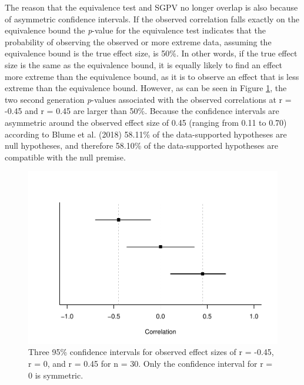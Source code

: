 \documentclass[,man,floatsintext]{apa6}
\begin{document}
The reason that the equivalence test and SGPV no longer overlap is also
because of asymmetric confidence intervals. If the observed correlation
falls exactly on the equivalence bound the \emph{p}-value for the
equivalence test indicates that the probability of observing the
observed or more extreme data, assuming the equivalence bound is the
true effect size, is 50\%. In other words, if the true effect size is
the same as the equivalence bound, it is equally likely to find an
effect more extreme than the equivalence bound, as it is to observe an
effect that is less extreme than the equivalence bound. However, as can
be seen in Figure \ref{fig:TOSTSGPV12}, the two second generation
\emph{p}-values associated with the observed correlations at r = -0.45
and r = 0.45 are larger than 50\%. Because the confidence intervals are
asymmetric around the observed effect size of 0.45 (ranging from 0.11 to
0.70) according to Blume et al. (2018) 58.11\% of the data-supported
hypotheses are null hypotheses, and therefore 58.10\% of the
data-supported hypotheses are compatible with the null premise.

\begin{figure}
\centering
\includegraphics{manuscript.R1_files/figure-latex/TOSTSGPV12-1.pdf}
\caption{\label{fig:TOSTSGPV12}Three 95\% confidence intervals for observed
effect sizes of r = -0.45, r = 0, and r = 0.45 for n = 30. Only the
confidence interval for r = 0 is symmetric.}
\end{figure}
\end{document}
